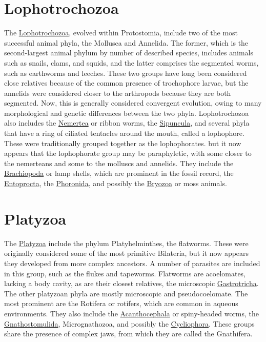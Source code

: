 \section{Lophotrochozoa}\label{lophotrochozoa}

The \href{https://en.wikipedia.org/wiki/Lophotrochozoa}{Lophotrochozoa},
evolved within Protostomia, include two of the most successful animal
phyla, the Mollusca and Annelida. The former, which is the
second-largest animal phylum by number of described species, includes
animals such as snails, clams, and squids, and the latter comprises the
segmented worms, such as earthworms and leeches. These two groups have
long been considered close relatives because of the common presence of
trochophore larvae, but the annelids were considered closer to the
arthropods because they are both segmented. Now, this is generally
considered convergent evolution, owing to many morphological and genetic
differences between the two phyla. Lophotrochozoa also includes the
\href{https://en.wikipedia.org/wiki/Nemertea}{Nemertea} or ribbon worms, the \href{https://en.wikipedia.org/wiki/Sipuncula}{Sipuncula}, and several phyla that have a
ring of ciliated tentacles around the mouth, called a lophophore. These
were traditionally grouped together as the lophophorates. but it now
appears that the lophophorate group may be paraphyletic, with some
closer to the nemerteans and some to the molluscs and annelids. They
include the \href{https://en.wikipedia.org/wiki/Brachiopod}{Brachiopoda} or lamp shells, which are prominent in the
fossil record, the \href{https://en.wikipedia.org/wiki/Entoprocta}{Entoprocta}, the \href{https://en.wikipedia.org/wiki/Phoronid}{Phoronida}, and possibly the \href{https://en.wikipedia.org/wiki/Bryozoa}{Bryozoa}
or moss animals.

\section{Platyzoa}\label{platyzoa}

The \href{https://en.wikipedia.org/wiki/Platyzoa}{Platyzoa} include the
phylum Platyhelminthes, the flatworms. These were originally considered
some of the most primitive Bilateria, but it now appears they developed
from more complex ancestors. A number of parasites are included in this
group, such as the flukes and tapeworms. Flatworms are acoelomates,
lacking a body cavity, as are their closest relatives, the microscopic
\href{https://en.wikipedia.org/wiki/Gastrotrich}{Gastrotricha}. The other platyzoan phyla are mostly microscopic and
pseudocoelomate. The most prominent are the Rotifera or rotifers, which
are common in aqueous environments. They also include the \href{https://en.wikipedia.org/wiki/Acanthocephala}{Acanthocephala}
or spiny-headed worms, the \href{https://en.wikipedia.org/wiki/Gnathostomulid}{Gnathostomulida}, Micrognathozoa, and possibly
the \href{https://en.wikipedia.org/wiki/Symbion}{Cycliophora}. These groups share the presence of complex jaws, from
which they are called the Gnathifera. 


